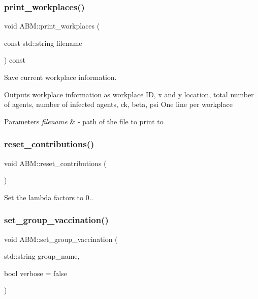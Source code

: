 \subsubsection{\texorpdfstring{print\+\_\+workplaces()}{print\_workplaces()}}
{\footnotesize\ttfamily void A\+B\+M\+::print\+\_\+workplaces (\begin{DoxyParamCaption}\item[{const std\+::string}]{filename }\end{DoxyParamCaption}) const}



Save current workplace information. 

Outputs workplace information as workplace ID, x and y location, total number of agents, number of infected agents, ck, beta, psi One line per workplace 
\begin{DoxyParams}{Parameters}
{\em filename} & -\/ path of the file to print to \\
\hline
\end{DoxyParams}
\mbox{\label{classABM_aa379d58dc83b31ad00ec57a1756fefd5}} 
\subsubsection{\texorpdfstring{reset\+\_\+contributions()}{reset\_contributions()}}
{\footnotesize\ttfamily void A\+B\+M\+::reset\+\_\+contributions (\begin{DoxyParamCaption}{ }\end{DoxyParamCaption})\hspace{0.3cm}{\ttfamily [inline]}}



Set the lambda factors to 0.. 

\mbox{\label{classABM_ab9fbab941825f16e4bce0fdb4b27363c}} 
\subsubsection{\texorpdfstring{set\+\_\+group\+\_\+vaccination()}{set\_group\_vaccination()}}
{\footnotesize\ttfamily void A\+B\+M\+::set\+\_\+group\+\_\+vaccination (\begin{DoxyParamCaption}\item[{std\+::string}]{group\+\_\+name,  }\item[{bool}]{verbose = {\ttfamily false} }\end{DoxyParamCaption})\hspace{0.3cm}{\ttfamily [inline]}}

